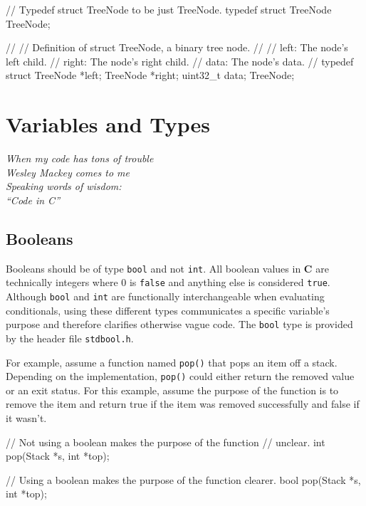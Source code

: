 \documentclass[11pt]{article}
\begin{document}
\begin{codelisting}{}
// Typedef struct TreeNode to be just TreeNode.
typedef struct TreeNode TreeNode;

//
// Definition of struct TreeNode, a binary tree node.
//
// left:   The node's left child.
// right:  The node's right child.
// data:   The node's data.
//
typedef struct {
    TreeNode *left;
    TreeNode *right;
    uint32_t data;
} TreeNode;
\end{codelisting}


\section{Variables and Types}

\textwidth
\epigraph{\emph{When my code has tons of trouble\\ Wesley Mackey comes to me\\
Speaking words of wisdom: \\ ``Code in C''}}{}


\subsection{Booleans}

\noindent Booleans should be of type \texttt{bool} and not \texttt{int}.  All
boolean values in \textbf{C} are technically integers where $0$ is
\texttt{false} and anything else is considered \texttt{true}. Although
\texttt{bool} and \texttt{int} are functionally interchangeable when evaluating
conditionals, using these different types communicates a specific variable's
purpose and therefore clarifies otherwise vague code. The \texttt{bool} type is
provided by the header file \texttt{stdbool.h}.

For example, assume a function named \texttt{pop()} that pops an item off a
stack. Depending on the implementation, \texttt{pop()} could either return the
removed value or an exit status. For this example, assume the purpose of the
function is to remove the item and return true if the item was removed
successfully and false if it wasn't.

\begin{codelisting}{}
// Not using a boolean makes the purpose of the function
// unclear.
int pop(Stack *s, int *top);

// Using a boolean makes the purpose of the function clearer.
bool pop(Stack *s, int *top);
\end{codelisting}
\end{document}
